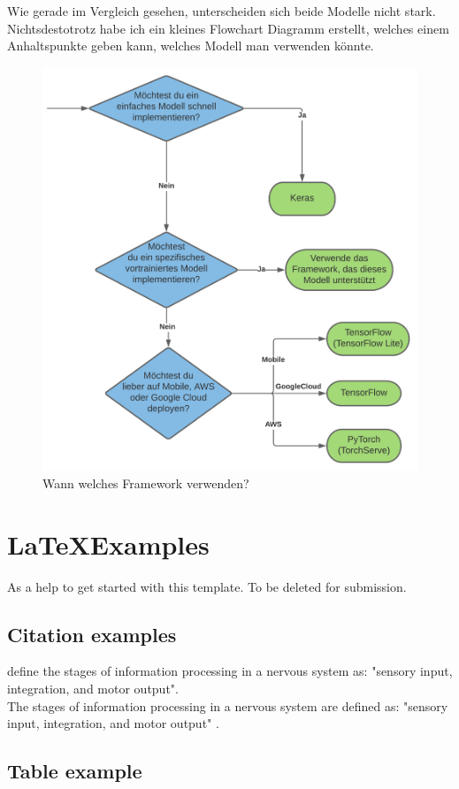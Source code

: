Wie gerade im Vergleich gesehen, unterscheiden sich beide Modelle nicht stark. Nichtsdestotrotz habe ich ein kleines Flowchart Diagramm erstellt, 
welches einem Anhaltspunkte geben kann, welches Modell man verwenden könnte. 

\begin{figure}[htbp]
    \centering
    \includegraphics[width=.9\textwidth]{figures/decision-tree}
    \caption{Wann welches Framework verwenden?}
    \label{fig:cnn}
\end{figure}

\newpage
\section{\LaTeX Examples}
As a help to get started with this template. To be deleted for submission.
\subsection{Citation examples}
\citet{campbell:2017} define the stages of information processing in a nervous system as: "sensory input, integration, and motor output". \\
The stages of information processing in a nervous system are defined as: "sensory input, integration, and motor output" \citep{campbell:2017}. 

\subsection{Table example}


